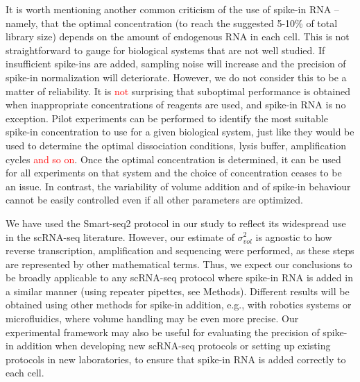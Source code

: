 \documentclass{article}
\newcommand{\revised}[1]{\textcolor{red}{#1}}
\begin{document}
It is worth mentioning another common criticism of the use of spike-in RNA -- namely, that the optimal concentration (to reach the suggested 5-10\% of total library size) depends on the amount of endogenous RNA in each cell.
This is not straightforward to gauge for biological systems that are not well studied.
If insufficient spike-ins are added, sampling noise will increase and the precision of spike-in normalization will deteriorate.
However, we do not consider this to be a matter of reliability.
It is \revised{not} surprising that suboptimal performance is obtained when inappropriate concentrations of reagents are used, and spike-in RNA is no exception.
Pilot experiments can be performed to identify the most suitable spike-in concentration to use for a given biological system, just like they would be used to determine the optimal dissociation conditions, lysis buffer, amplification cycles \revised{and so on}.
Once the optimal concentration is determined, it can be used for all experiments on that system and the choice of concentration ceases to be an issue.
In contrast, the variability of volume addition and of spike-in behaviour cannot be easily controlled even if all other parameters are optimized. 

We have used the Smart-seq2 protocol in our study to reflect its widespread use in the scRNA-seq literature.
However, our estimate of $\sigma^2_{vol}$ is agnostic to how reverse transcription, amplification and sequencing were performed, as these steps are represented by other mathematical terms.
Thus, we expect our conclusions to be broadly applicable to any scRNA-seq protocol where spike-in RNA is added in a similar manner (using repeater pipettes, see Methods).
Different results will be obtained using other methods for spike-in addition, e.g., with robotics systems or microfluidics, where volume handling may be even more precise.
Our experimental framework may also be useful for evaluating the precision of spike-in addition when developing new scRNA-seq protocols or setting up existing protocols in new laboratories, to ensure that spike-in RNA is added correctly to each cell.
\end{document}
